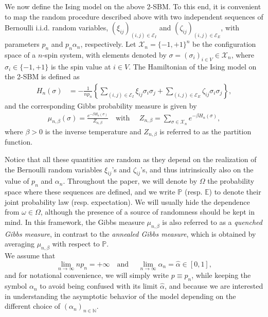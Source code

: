 \documentclass[11pt,oneside]{amsart}
\numberwithin{equation}{section}  %
\theoremstyle{plain}
\theoremstyle{remark}
\def \N {{\mathbb N}}
\def \E {{\mathbb E}}
\def \cE {\mathcal{E}}
\def \s {{\sigma}}
\begin{document}
We now define the Ising model on the above 2-SBM. To this end, it is convenient to map the random procedure 
described above with two independent sequences  of Bernoulli i.i.d. random variables, 
$(\xi_{ij})_{(i,j)\in \cE_I}$ and $(\zeta_{ij})_{(i,j)\in \cE_E}$, 
with parameters $p_n$ and $p_n\alpha_n$, respectively. Let $\mathcal{X}_{n}=\{-1,+1\}^{n}$ be the configuration space of a $n$-spin system, 
with elements denoted by $\sigma=(\s_i)_{i\in V} \in \mathcal{X}_{n}$, where $\sigma_i\in\{-1,+1\}$ 
is the spin value at $i \in V$. 
The Hamiltonian of the Ising model on the 2-SBM is defined as
\begin{align}\label{def:hamil-DCW}
    H_{n}(\sigma)&=-\frac{1}{np_n} \left\{ \sum_{(i,j) \in \cE_I} \xi_{ij} \sigma_i \sigma_j + \sum_{(i,j) \in \cE_E} \zeta_{ij} \sigma_i \sigma_j \right \},
\end{align}
%
and the corresponding Gibbs probability measure is given by
\begin{align*}
    \mu_{n,\beta}(\sigma)=\frac{e^{-\beta H_n(\sigma)}}{Z_{n,\beta}}\quad \mbox{with } \quad Z_{n,\beta}=\sum_{\sigma\in\mathcal{X}_n} e^{-\beta H_n(\sigma)},
    \end{align*}
where $\beta> 0$ is the inverse temperature and $Z_{n,\beta}$ is referred to as the partition function.

Notice that all these quantities are random as they depend on the realization of the Bernoulli random variables $\xi_{ij}$'s and $\zeta_{ij}$'s, and thus intrinsically also on the value of $p_n$ and $\alpha_n$.
Throughout the paper, we will denote by $\Omega$ the probability space where these sequences are defined, and we write $\mathbb{P}$ (resp. $\E$) to denote their joint probability law (resp. expectation). We will usually hide the dependence from $\omega\in\Omega$,  although the presence of a source of randomness should be kept in mind. In this framework, the Gibbs measure $\mu_{n,\beta}$ is also referred to as a \textit{quenched Gibbs measure}, in contrast to the \textit{annealed Gibbs measure}, which is obtained by averaging $\mu_{n,\beta}$ with respect to $\mathbb{P}$.\\

We assume that
\begin{equation}\label{assump}
\lim_{n\to\infty}n p_n =+\infty \quad \mbox{and } \quad \lim_{n\to\infty}\alpha_n= \hat\alpha\in [0,1],
\end{equation}
and for notational convenience, we will simply write $p\equiv p_n$, while keeping the symbol $\alpha_n$
to avoid being confused with its limit $\hat\alpha$, and because we are interested in understanding the asymptotic behavior of the model depending on the different choice of $(\alpha_n)_{n\in\N}$.\\
\end{document}

